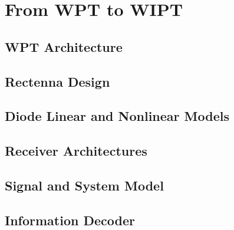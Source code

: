 \chapter{From WPT to WIPT}



\section{WPT Architecture}\label{sec:wpt-architecture}
  

\section{Rectenna Design}\label{sec:rectenna-design}
  

\section{Diode Linear and Nonlinear Models}\label{sec:diode-linear-and-nonlinear-models}
  

\section{Receiver Architectures}\label{sec:receiver-architectures}
  

\section{Signal and System Model}\label{sec:signal-and-system-model}
  

\section{Information Decoder}\label{sec:information-decoder}
  

%   